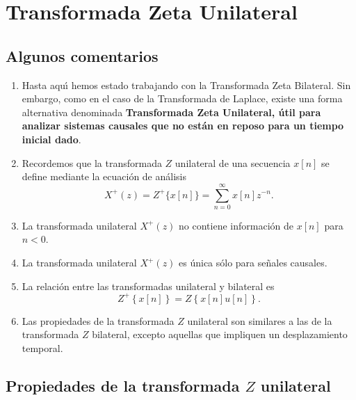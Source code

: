\section{Transformada Zeta Unilateral}

\subsection{Algunos comentarios}

\begin{enumerate}

\item Hasta aqu\'{\i} hemos estado trabajando con la Transformada Zeta Bilateral. Sin embargo, como en el 
caso de la Transformada de Laplace, existe una forma alternativa denominada 
\textbf{Transformada Zeta Unilateral, \'{u}til para analizar sistemas causales que no est\'{a}n en
reposo para un tiempo inicial dado}. 

\item Recordemos que la transformada $Z$ unilateral de una secuencia $x\left[ n\right] $ se define 
mediante la ecuaci\'{o}n de an\'{a}lisis 
\begin{equation}
        X^{+}\left( z\right) = Z^{+}\{x[n]\} = \sum_{n=0}^{\infty }x\left[ n\right] z^{-n}.
\end{equation}

\item La transformada unilateral $X^{+}(z)$ no contiene informaci\'{o}n de $x[n]$ para $n<0$.

\item La transformada unilateral $X^{+}(z)$ es \'{u}nica s\'{o}lo para se\~{n}ales causales.

\item La relaci\'{o}n entre las transformadas unilateral y bilateral es
\begin{equation}
  Z^{+}\left\{x[n]\right\} = Z\left\{x[n] u[n]\right\}.
\end{equation}

\item Las propiedades de la transformada $Z$ unilateral son similares a las de la transformada $Z$ 
bilateral, excepto aquellas que impliquen un desplazamiento temporal.
\end{enumerate}

\subsection{Propiedades de la transformada $Z$ unilateral}

